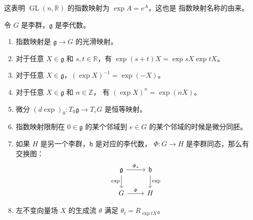 \documentclass[fontset=none]{Notes}
\DeclareMathOperator\GL{GL}
\newcommand{\lie}[1]{\mathfrak{#1}}
\begin{document}
\begin{example}
  这表明 $\GL(n,\mathbb{R})$ 的指数映射为 $\exp A=e^A$，这也是
  指数映射名称的由来。
\end{example}

\begin{proposition}[指数映射的性质]
  令 $G$ 是李群，$\lie g$ 是李代数。
  \begin{enumerate}
    \item 指数映射是 $\lie g\to G$ 的光滑映射。
    \item 对于任意 $X\in\lie g$ 和 $s,t\in \mathbb{R}$，有
    $\exp(s+t)X=\exp sX \exp tX$。
    \item 对于任意 $X\in\lie g$，$(\exp X)^{-1}=\exp(-X)$。
    \item 对于任意 $X\in\lie g$ 和 $n\in \mathbb{Z}$，
    有 $(\exp X)^n=\exp(nX)$。
    \item 微分 $(d\exp)_0:T_0\lie g\to T_eG$ 是恒等映射。
    \item 指数映射限制在 $0\in \lie g$ 的某个邻域到
    $e\in G$ 的某个邻域的时候是微分同胚。
    \item 如果 $H$ 是另一个李群，$\lie h$ 是对应的李代数，
    $\varPhi:G\to H$ 是李群同态，那么有交换图：
    \begin{equation}
      \begin{tikzcd}
        \lie g\arrow[d,"\exp"']\arrow[r,"\varPhi_*"] &\lie h
        \arrow[d,"\exp"] \\
        G\arrow[r,"\varPhi"] & H 
      \end{tikzcd}
    \end{equation}
    \item 左不变向量场 $X$ 的生成流 $\theta$ 满足 
    $\theta_t=R_{\exp tX}$。
  \end{enumerate}  
\end{proposition}
\end{document}
